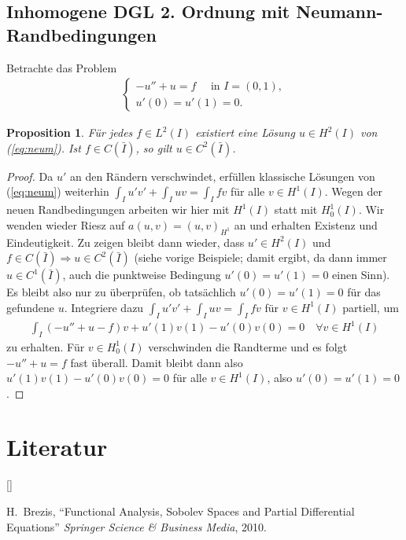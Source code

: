 \documentclass[twoside]{article}
\def\beginrefs{\begin{list}%
        {[\arabic{equation}]}{\usecounter{equation}
         \setlength{\leftmargin}{2.0truecm}\setlength{\labelsep}{0.4truecm}%
         \setlength{\labelwidth}{1.6truecm}}}
\def\endrefs{\end{list}}
\def\bibentry#1{\item[\hbox{[#1]}]}
\newtheorem{proposition}[theorem]{Proposition}
\theoremstyle{definition}
\begin{document}
\subsection{Inhomogene DGL 2. Ordnung mit Neumann-Randbedingungen}
Betrachte das Problem
\begin{align}
\begin{cases}
-u'' + u = f \quad \text{ in } I = (0,1),\\
u'(0)=u'(1)=0.
\end{cases} \label{eq:neum}
\end{align}
\begin{proposition}
Für jedes $f \in L^2(I)$ existiert eine Lösung $u \in H^2(I)$ von (\ref{eq:neum}). Ist $f \in C(\bar{I})$, so gilt $u \in C^2(\bar{I})$.
\end{proposition}
\begin{proof}
Da $u'$ an den Rändern verschwindet, erfüllen klassische Lösungen von (\ref{eq:neum}) weiterhin $\int_I u'v' + \int_I uv = \int_I fv$ für alle $v \in H^1(I)$. Wegen der neuen Randbedingungen arbeiten wir hier mit $H^1(I)$ statt mit $H^1_0(I)$. Wir wenden wieder Riesz auf $a(u,v) = (u,v)_{H^1}$ an und erhalten Existenz und Eindeutigkeit. Zu zeigen bleibt dann wieder, dass $u' \in H^2(I)$ und $f \in C(\bar{I}) \Rightarrow u \in C^2(\bar{I})$ (siehe vorige Beispiele; damit ergibt, da dann immer $u \in C^1(\bar{I})$, auch die punktweise Bedingung $u'(0)=u'(1)=0$ einen Sinn). Es bleibt also nur zu überprüfen, ob tatsächlich $u'(0)=u'(1)=0$ für das gefundene $u$. Integriere dazu  $\int_I u'v' + \int_I uv = \int_I fv$ für $v \in H^1(I)$ partiell, um
\begin{align*}
\int_I (-u'' +u - f)v  + u'(1)v(1)-u'(0)v(0) = 0 \quad \forall v \in H^1(I)
\end{align*}
zu erhalten. Für $v \in H_0^1(I)$ verschwinden die Randterme und es folgt $-u'' +u = f$ fast überall. Damit bleibt dann also $u'(1)v(1)-u'(0)v(0) = 0$ für alle $v \in H^1(I)$, also $u'(0)=u'(1)=0$.
\end{proof}
\section*{Literatur}
\beginrefs
\bibentry{1}{\sc H.~Brezis}, 
``Functional Analysis, Sobolev Spaces and Partial Differential Equations''
{\it Springer Science \& Business Media},
2010.
\endrefs
\end{document}
